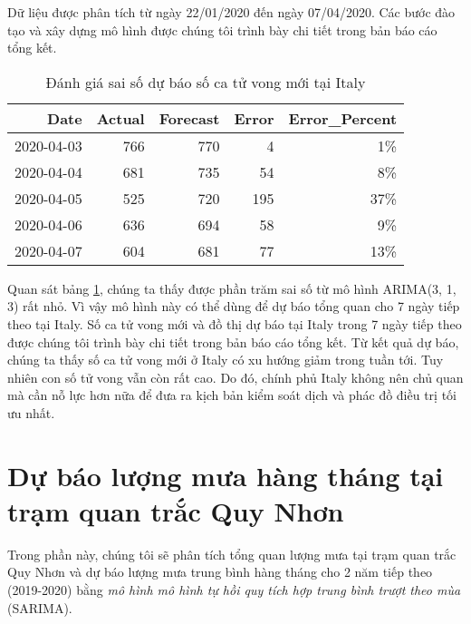 \documentclass[12pt, a4paper,oneside]{book}
\theoremstyle{definition}
\begin{document}
Dữ liệu được phân tích từ ngày 22/01/2020 đến ngày 07/04/2020. Các bước đào tạo và xây dựng mô hình được chúng tôi trình bày chi tiết trong bản báo cáo tổng kết.
\begin{table}[!h]	
	\caption{Đánh giá sai số dự báo số ca tử vong mới tại Italy}
    \label{Italy}
	\centering
	\fontsize{6}{8}\selectfont
	\begin{tabular}[t]{rrrrr}
		\toprule
		Date & Actual & Forecast & Error & Error\_Percent\\
		\midrule
		\rowcolor{gray!6}  2020-04-03 & 766 & 770 & 4 & 1\%\\
		2020-04-04 & 681 & 735 & 54 & 8\%\\
		\rowcolor{gray!6}  2020-04-05 & 525 & 720 & 195 & 37\%\\
		2020-04-06 & 636 & 694 & 58 & 9\%\\
		\rowcolor{gray!6}  2020-04-07 & 604 & 681 & 77 & 13\%\\
		\bottomrule
	\end{tabular}
\end{table}
Quan sát bảng \ref{Italy}, chúng ta thấy được phần trăm sai số từ mô hình ARIMA(3, 1, 3) rất nhỏ. Vì vậy mô hình này có thể dùng để dự báo tổng quan cho 7 ngày tiếp theo tại Italy. Số ca tử vong mới và đồ thị dự báo tại Italy trong 7 ngày tiếp theo được chúng tôi trình bày chi tiết trong bản báo cáo tổng kết. Từ kết quả dự báo, chúng ta thấy số ca tử vong mới ở Italy có xu hướng giảm trong tuần tới. Tuy nhiên con số tử vong vẫn còn rất cao. Do đó, chính phủ Italy không nên chủ quan mà cần nỗ lực hơn nữa để đưa ra kịch bản kiểm soát dịch và phác đồ điều trị tối ưu nhất.

\section{Dự báo lượng mưa hàng tháng tại trạm quan trắc Quy Nhơn}
Trong phần này, chúng tôi sẽ phân tích tổng quan lượng mưa tại trạm quan trắc Quy Nhơn và dự báo lượng mưa trung bình hàng tháng cho 2 năm tiếp theo (2019-2020) bằng \textit{mô hình mô hình tự hồi quy tích hợp trung bình trượt theo mùa} (SARIMA).
\end{document}
